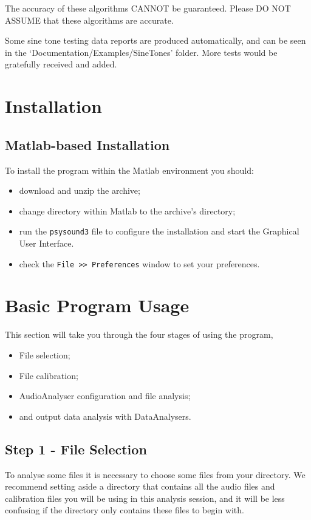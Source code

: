 \documentclass{article}
\begin{document}
The accuracy of these algorithms CANNOT be guaranteed. Please DO NOT ASSUME that these algorithms are accurate. 

Some sine tone testing data reports are produced automatically, and can be seen in the `Documentation/Examples/SineTones' folder. More tests would be gratefully received and added.

\section{Installation}

\subsection{Matlab-based Installation}
To install the program within the Matlab environment you should: 

\begin{itemize} 
	\item download and unzip the archive; 
	\item change directory within Matlab to the archive's directory;
	\item run the \texttt{psysound3} file to configure the installation and start the Graphical User Interface.
	\item check the \texttt{File >> Preferences} window to set your preferences. 
\end{itemize}

\clearpage
\section{Basic Program Usage}

This section will take you through the four stages of using the program,
\begin{itemize}
	\item File selection; 
	\item File calibration; 
	\item AudioAnalyser configuration and file analysis;
	\item and output data analysis with DataAnalysers.
\end{itemize}

\subsection{Step 1 - File Selection}

To analyse some files it is necessary to choose some files from your directory. We recommend setting aside a directory that contains all the audio files and calibration files you will be using in this analysis session, and it will be less confusing if the directory only contains these files to begin with. 
\end{document}
